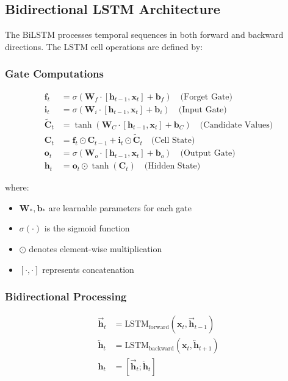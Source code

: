 \documentclass[12pt]{article}
\newcommand{\vecbf}[1]{\mathbf{#1}}
\newcommand{\lstm}{\text{LSTM}}
\begin{document}
\subsection{Bidirectional LSTM Architecture}

The BiLSTM processes temporal sequences in both forward and backward directions. The LSTM cell operations are defined by:

\subsubsection{Gate Computations}

\begin{align}
\vecbf{f}_t &= \sigma(\vecbf{W}_f \cdot [\vecbf{h}_{t-1}, \vecbf{x}_t] + \vecbf{b}_f) \quad \text{(Forget Gate)} \\
\vecbf{i}_t &= \sigma(\vecbf{W}_i \cdot [\vecbf{h}_{t-1}, \vecbf{x}_t] + \vecbf{b}_i) \quad \text{(Input Gate)} \\
\tilde{\vecbf{C}}_t &= \tanh(\vecbf{W}_C \cdot [\vecbf{h}_{t-1}, \vecbf{x}_t] + \vecbf{b}_C) \quad \text{(Candidate Values)} \\
\vecbf{C}_t &= \vecbf{f}_t \odot \vecbf{C}_{t-1} + \vecbf{i}_t \odot \tilde{\vecbf{C}}_t \quad \text{(Cell State)} \\
\vecbf{o}_t &= \sigma(\vecbf{W}_o \cdot [\vecbf{h}_{t-1}, \vecbf{x}_t] + \vecbf{b}_o) \quad \text{(Output Gate)} \\
\vecbf{h}_t &= \vecbf{o}_t \odot \tanh(\vecbf{C}_t) \quad \text{(Hidden State)}
\end{align}

where:
\begin{itemize}
    \item $\vecbf{W}_*, \vecbf{b}_*$ are learnable parameters for each gate
    \item $\sigma(\cdot)$ is the sigmoid function
    \item $\odot$ denotes element-wise multiplication
    \item $[\cdot, \cdot]$ represents concatenation
\end{itemize}

\subsubsection{Bidirectional Processing}

\begin{align}
\overrightarrow{\vecbf{h}}_t &= \lstm_{\text{forward}}(\vecbf{x}_t, \overrightarrow{\vecbf{h}}_{t-1}) \\
\overleftarrow{\vecbf{h}}_t &= \lstm_{\text{backward}}(\vecbf{x}_t, \overleftarrow{\vecbf{h}}_{t+1}) \\
\vecbf{h}_t &= [\overrightarrow{\vecbf{h}}_t; \overleftarrow{\vecbf{h}}_t]
\end{align}
\end{document}
